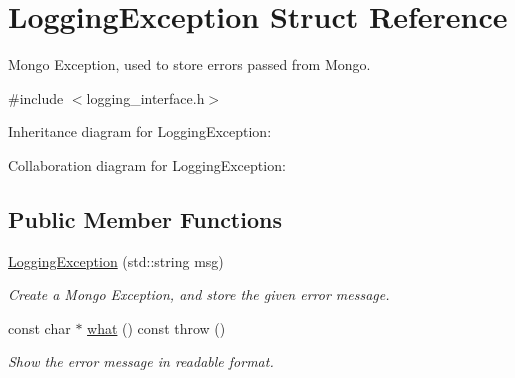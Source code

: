 \hypertarget{structLoggingException}{}\section{Logging\+Exception Struct Reference}
\label{structLoggingException}


Mongo Exception, used to store errors passed from Mongo.  




{\ttfamily \#include $<$logging\+\_\+interface.\+h$>$}



Inheritance diagram for Logging\+Exception\+:


Collaboration diagram for Logging\+Exception\+:
\subsection*{Public Member Functions}
\begin{DoxyCompactItemize}
\item 
\hyperlink{structLoggingException_ab82d378b1a05f798ab9b738c79dbec16}{Logging\+Exception} (std\+::string msg)\hypertarget{structLoggingException_ab82d378b1a05f798ab9b738c79dbec16}{}\label{structLoggingException_ab82d378b1a05f798ab9b738c79dbec16}

\begin{DoxyCompactList}\small\item\em Create a Mongo Exception, and store the given error message. \end{DoxyCompactList}\item 
const char $\ast$ \hyperlink{structLoggingException_a2a34c710bcde768940ae6029c2a93f48}{what} () const   throw ()\hypertarget{structLoggingException_a2a34c710bcde768940ae6029c2a93f48}{}\label{structLoggingException_a2a34c710bcde768940ae6029c2a93f48}

\begin{DoxyCompactList}\small\item\em Show the error message in readable format. \end{DoxyCompactList}\end{DoxyCompactItemize}
